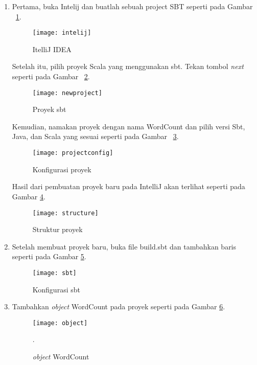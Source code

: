 \begin{enumerate}

\item Pertama, buka Intelij dan buatlah sebuah project SBT seperti pada Gambar ~\ref{fig:intelij}.

\begin{figure}[H]
    \centering  
    \texttt{[image: intelij]}  
    \caption[ItelliJ IDEA]{ItelliJ IDEA} 
    \label{fig:intelij} 
\end{figure}

Setelah itu, pilih proyek Scala yang menggunakan sbt. Tekan tombol \textit{next} seperti pada Gambar ~\ref{fig:newproject}.

\begin{figure}[H]
    \centering  
    \texttt{[image: newproject]}  
    \caption[Proyek sbt]{Proyek sbt} 
    \label{fig:newproject} 
\end{figure}

Kemudian, namakan proyek dengan nama WordCount dan pilih versi Sbt, Java, dan Scala yang sesuai seperti pada Gambar ~\ref{fig:projectconfig}. 

\begin{figure}[H]
    \centering  
    \texttt{[image: projectconfig]}  
    \caption[Konfigurasi proyek]{Konfigurasi proyek} 
    \label{fig:projectconfig} 
\end{figure}

Hasil dari pembuatan proyek baru pada IntelliJ akan terlihat seperti pada Gambar \ref{fig:structure}.

\begin{figure}[H]
    \centering  
    \texttt{[image: structure]}  
    \caption[Struktur proyek ]{Struktur proyek} 
    \label{fig:structure} 
\end{figure}

\item Setelah membuat proyek baru, buka file build.sbt dan tambahkan baris seperti pada Gambar \ref{fig:sbt}.


\begin{figure}[H]
    \centering  
    \texttt{[image: sbt]}  
    \caption[Konfigurasi sbt]{Konfigurasi sbt} 
    \label{fig:sbt} 
\end{figure}

\item Tambahkan \textit{object} WordCount pada proyek seperti pada Gambar \ref{fig:object}.

\begin{figure}[H]
    \centering  
    \texttt{[image: object]}  
    \caption[\textit{object} WordCount]{\textit{object} WordCount}.
    \label{fig:object} 
\end{figure}



\end{enumerate}
